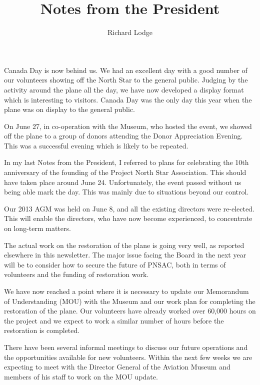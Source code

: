 %


\title{Notes from the President}
\author{Richard Lodge}

\maketitle

Canada Day is now behind us.  We had an excellent day with a good
number of our volunteers showing off the North Star to the general
public. Judging by the activity around the plane all the day, we have
now developed a display format which is interesting to visitors.
Canada Day was the only day this year when the plane was on display to
the general public.

On June 27, in co-operation with the Museum, who hosted the event, we
showed off the plane to a group of donors attending the Donor
Appreciation Evening.  This was a successful evening which is likely
to be repeated.

In my last Notes from the President, I referred to plans for
celebrating the 10th anniversary of the founding of the Project North
Star Association.  This should have taken place around June 24.
Unfortunately, the event passed without us being able mark the
day. This was mainly due to situations beyond our control.

Our 2013 AGM was held on June 8, and all the existing directors were
re-elected.  This will enable the directors, who have now become
experienced, to concentrate on long-term matters.

The actual work on the restoration of the plane is going very well, as
reported elsewhere in this newsletter. The major issue facing the
Board in the next year will be to consider how to secure the future of
PNSAC, both in terms of volunteers and the funding of restoration
work.

We have now reached a point where it is necessary to update our
Memorandum of Understanding (MOU) with the Museum and our work plan
for completing the restoration of the plane.  Our volunteers have
already worked over 60,000 hours on the project and we expect to work
a similar number of hours before the restoration is completed.

There have been several informal meetings to discuss our future
operations and the opportunities available for new volunteers.  Within
the next few weeks we are expecting to meet with the Director General
of the Aviation Museum and members of his staff to work on the MOU
update.

